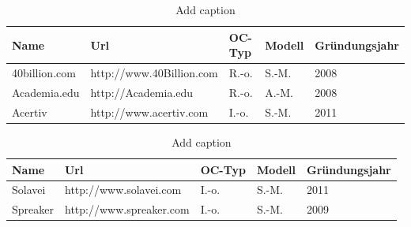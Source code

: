 \appendix

\chapter{}

\begin{table}[htbp]
  \centering
  
  {
  \small
    \begin{tabular}{lllll}
    \toprule
    Name  & Url & OC-Typ & Modell & Gründungsjahr \\
    \midrule
    40billion.com & http://www.40Billion.com & R.-o. & S.-M. & 2008 \\
    Academia.edu & http://Academia.edu & R.-o. & A.-M. & 2008 \\
    Acertiv & http://www.acertiv.com & I.-o. & S.-M. & 2011 \\
 

    \bottomrule
    \end{tabular}%
    \caption{Add caption}
   }
  \label{tab:addlabel}%
\end{table}%

\begin{table}[htbp]
  \centering
  	{
  	\small
    \begin{tabular}{lllll}
    \toprule
    Name  & Url & OC-Typ & Modell & Gründungsjahr \\
    \midrule
    Solavei & http://www.solavei.com & I.-o. & S.-M. & 2011 \\
    Spreaker & http://www.spreaker.com & I.-o. & S.-M. & 2009 \\
    
    \bottomrule
    \end{tabular}%
    }
    \caption{Add caption}
  \label{tab:addlabel}%
\end{table}%
